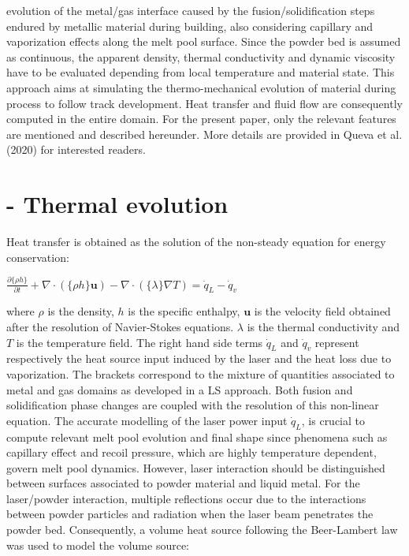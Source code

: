 \documentclass[10pt]{article}
\begin{document}
evolution of the metal/gas interface caused by the fusion/solidification steps endured by metallic material during building, also considering capillary and vaporization effects along the melt pool surface. Since the powder bed is assumed as continuous, the apparent density, thermal conductivity and dynamic viscosity have to be evaluated depending from local temperature and material state. This approach aims at simulating the thermo-mechanical evolution of material during process to follow track development. Heat transfer and fluid flow are consequently computed in the entire domain. For the present paper, only the relevant features are mentioned and described hereunder. More details are provided in Queva et al. (2020) for interested readers.

\section*{- Thermal evolution}
Heat transfer is obtained as the solution of the non-steady equation for energy conservation:

$\frac{\partial\{\rho h\}}{\partial t}+\nabla \cdot(\{\rho h\} \boldsymbol{u})-\nabla \cdot(\{\lambda\} \nabla T)=\dot{q}_{L}-\dot{q}_{v}$

where $\rho$ is the density, $h$ is the specific enthalpy, $\boldsymbol{u}$ is the velocity field obtained after the resolution of Navier-Stokes equations. $\lambda$ is the thermal conductivity and $T$ is the temperature field. The right hand side terms $\dot{q}_{L}$ and $\dot{q}_{v}$ represent respectively the heat source input induced by the laser and the heat loss due to vaporization. The brackets correspond to the mixture of quantities associated to metal and gas domains as developed in a LS approach. Both fusion and solidification phase changes are coupled with the resolution of this non-linear equation. The accurate modelling of the laser power input $\dot{q}_{L}$, is crucial to compute relevant melt pool evolution and final shape since phenomena such as capillary effect and recoil pressure, which are highly temperature dependent, govern melt pool dynamics. However, laser interaction should be distinguished between surfaces associated to powder material and liquid metal. For the laser/powder interaction, multiple reflections occur due to the interactions between powder particles and radiation when the laser beam penetrates the powder bed. Consequently, a volume heat source following the Beer-Lambert law was used to model the volume source:
\end{document}

